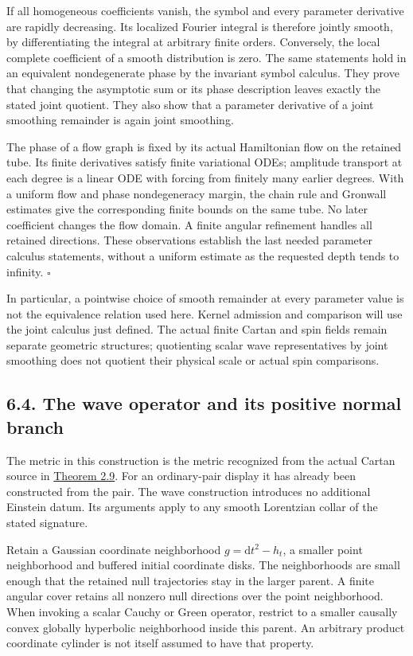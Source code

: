 \documentclass[
  english,
  11pt,
  reqno]{amsart}
\begin{document}
If all homogeneous coefficients vanish, the symbol and every parameter
derivative are rapidly decreasing. Its localized Fourier integral is
therefore jointly smooth, by differentiating the integral at arbitrary
finite orders. Conversely, the local complete coefficient of a smooth
distribution is zero. The same statements hold in an equivalent
nondegenerate phase by the invariant symbol calculus. They prove that
changing the asymptotic sum or its phase description leaves exactly the
stated joint quotient. They also show that a parameter derivative of a
joint smoothing remainder is again joint smoothing.

The phase of a flow graph is fixed by its actual Hamiltonian flow on the
retained tube. Its finite derivatives satisfy finite variational ODEs;
amplitude transport at each degree is a linear ODE with forcing from
finitely many earlier degrees. With a uniform flow and phase
nondegeneracy margin, the chain rule and Gronwall estimates give the
corresponding finite bounds on the same tube. No later coefficient
changes the flow domain. A finite angular refinement handles all
retained directions. These observations establish the last needed
parameter calculus statements, without a uniform estimate as the
requested depth tends to infinity. \hfill\(\square\)

In particular, a pointwise choice of smooth remainder at every parameter
value is not the equivalence relation used here. Kernel admission and
comparison will use the joint calculus just defined. The actual finite
Cartan and spin fields remain separate geometric structures; quotienting
scalar wave representatives by joint smoothing does not quotient their
physical scale or actual spin comparisons.

\subsection{6.4. The wave operator and its positive normal
branch}\label{the-wave-operator-and-its-positive-normal-branch}\label{sec:online-wave-factorization}

The metric in this construction is the metric recognized from the actual
Cartan source in \hyperref[thm:online-cartan-collar-recognition]{Theorem
2.9}. For an ordinary-pair display it has already been constructed from
the pair. The wave construction introduces no additional Einstein datum.
Its arguments apply to any smooth Lorentzian collar of the stated
signature.

Retain a Gaussian coordinate neighborhood \(g=\mathrm dt^2-h_t\), a
smaller point neighborhood and buffered initial coordinate disks. The
neighborhoods are small enough that the retained null trajectories stay
in the larger parent. A finite angular cover retains all nonzero null
directions over the point neighborhood. When invoking a scalar Cauchy or
Green operator, restrict to a smaller causally convex globally
hyperbolic neighborhood inside this parent. An arbitrary product
coordinate cylinder is not itself assumed to have that property.
\end{document}
